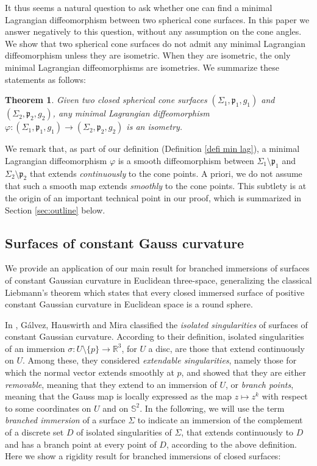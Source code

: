 \documentclass[JEP,XML,SOM,Unicode,NoEqCountersInSection,published]{cedram}
\newtheorem{theorem}[cor]{Theorem}
\theoremstyle{definition}
\newcommand{\R}{{\mathbb R}}
\begin{document}
It thus seems a natural question to ask whether one can find a minimal Lagrangian diffeomorphism between two spherical cone surfaces. In this paper we answer negatively to this question, without any assumption on the cone angles. We show that two spherical cone surfaces do not admit any minimal Lagrangian diffeomorphism unless they are isometric. When they are isometric, the only minimal Lagrangian diffeomorphisms are isometries. We summarize these statements as follows:

\begin{theorem}\label{thm:main1}
Given two closed spherical cone surfaces $(\Sigma_1,\mathfrak p_1,g_1)$ and $(\Sigma_2,\mathfrak p_2,g_2)$, any minimal Lagrangian diffeomorphism $\varphi:(\Sigma_1,\mathfrak p_1,g_1)\to(\Sigma_2,\mathfrak p_2,g_2)$ is an isometry.
\end{theorem}

We remark that, as part of our definition (Definition \ref{defi min lag}), a minimal Lagrangian diffeomorphism $\varphi$ is a smooth diffeomorphism between $\Sigma_1\setminus\mathfrak p_1$ and $\Sigma_2\setminus\mathfrak p_2$ that extends \emph{continuously} to the cone points. A priori, we do not assume that such a smooth map extends \emph{smoothly} to the cone points. This subtlety is at the origin of an important technical point in our proof, which is summarized in Section \ref{sec:outline} below.

\subsection{Surfaces of constant Gauss curvature}

We provide an application of our main result for branched immersions of surfaces of constant Gaussian curvature in Euclidean three-space, generalizing the classical Liebmann's theorem which states that every closed immersed surface of positive constant Gaussian curvature in Euclidean space is a round sphere.

In \cite{zbMATH06243957}, Gálvez, Hauswirth and Mira classified the \emph{isolated singularities} of surfaces of constant Gaussian curvature. According to their definition, isolated singularities of an immersion $\sigma:U\setminus\{p\}\to\R^3$, for $U$ a disc, are those that extend continuously on $U$. Among these, they considered \emph{extendable singularities}, namely those for which the normal vector extends smoothly at $p$, and showed that they are either \emph{removable}, meaning that they extend to an immersion of $U$, or \emph{branch points}, meaning that the Gauss map is locally expressed as the map $z\mapsto z^k$ with respect to some coordinates on $U$ and on $\mathbb S^2$. {In the following, we will use the term \emph{branched immersion} of a surface $\Sigma$ to indicate an immersion of the complement of a discrete set $D$ {of isolated singularities} of $\Sigma$, that extends continuously to $D$ and has a branch point at every point of $D$, according to the above definition.} Here we show a rigidity result for branched immersions of closed surfaces:
\end{document}
